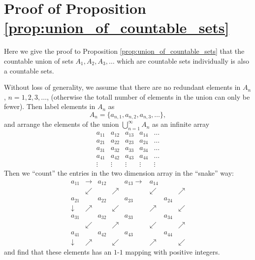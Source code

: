 \documentclass[a4paper,12pt]{article}
\theoremstyle{definition}
\theoremstyle{remark}
\begin{document}
\section{Proof of Proposition \ref{prop:union_of_countable_sets}} \label{sec:proof_of_union_of_countable_sets_countable}

Here we give the proof to Proposition \ref{prop:union_of_countable_sets} that the countable union of sets $A_1, A_2, A_3, \dotsc$ which are countable sets individually is also a countable sets.

Without loss of generality, we assume that there are no redundant elements in $A_n$, $n =1, 2, 3, \dotsc$, (otherwise the totall number of elements in the union can only be fewer). Then label elements in $A_n$ as
\begin{equation}
  A_n = \{ a_{n, 1}, a_{n, 2}, a_{n, 3}, \dotsc \},
\end{equation}
and arrange the elements of the union $\bigcup^{\infty}_{n = 1} A_n$ as an infinite array
\begin{equation}
  \begin{matrix}
    a_{11} & a_{12} & a_{13} & a_{14} & \dots \\
    a_{21} & a_{22} & a_{23} & a_{24} & \dots \\
    a_{31} & a_{32} & a_{33} & a_{34} & \dots \\
    a_{41} & a_{42} & a_{43} & a_{44} & \dots \\
    \vdots & \vdots & \vdots & \vdots & \vdots
  \end{matrix}
\end{equation}
Then we ``count'' the entries in the two dimension array in the ``snake'' way:
\begin{equation}
  \begin{matrix}
    a_{11} & \rightarrow & a_{12} & & a_{13} \rightarrow & a_{14} &  \\
     & \swarrow & & \nearrow & & \swarrow & & \nearrow \\
    a_{21} & & a_{22} & & a_{23} & & a_{24} & \\
    \downarrow & \nearrow & & \swarrow & & \nearrow & & \swarrow \\
    a_{31} & & a_{32} & & a_{33} & & a_{34} & \\
     & \swarrow & & \nearrow & & \swarrow & & \nearrow \\
    a_{41} & & a_{42} & & a_{43} & & a_{44} & \\
    \downarrow & \nearrow & & \swarrow & & \nearrow & & \swarrow 
  \end{matrix}
\end{equation}
and find that these elements has an $1$-$1$ mapping with positive integers.
\end{document}
